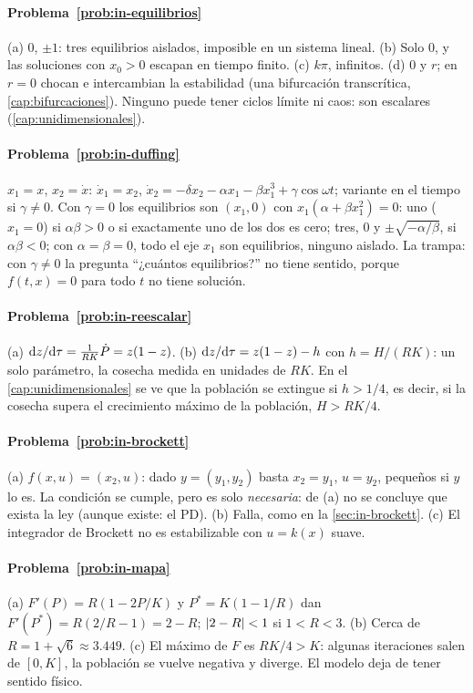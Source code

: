 \paragraph{Problema~\ref{prob:in-equilibrios}}
(a) $0$, $\pm1$: tres equilibrios aislados, imposible en un sistema lineal. (b) Solo $0$, y las soluciones con $x_0>0$ escapan en tiempo finito. (c) $k\pi$, infinitos. (d) $0$ y $r$; en $r=0$ chocan e intercambian la estabilidad (una bifurcación transcrítica, \cref{cap:bifurcaciones}). Ninguno puede tener ciclos límite ni caos: son escalares (\cref{cap:unidimensionales}).

\paragraph{Problema~\ref{prob:in-duffing}}
$x_1=x$, $x_2=\dot x$: $\dot x_1=x_2$, $\dot x_2=-\delta x_2-\alpha x_1-\beta x_1^3+\gamma\cos\omega t$; variante en el tiempo si $\gamma\neq0$. Con $\gamma=0$ los equilibrios son $(x_1,0)$ con $x_1(\alpha+\beta x_1^2)=0$: uno ($x_1=0$) si $\alpha\beta>0$ o si exactamente uno de los dos es cero; tres, $0$ y $\pm\sqrt{-\alpha/\beta}$, si $\alpha\beta<0$; con $\alpha=\beta=0$, todo el eje $x_1$ son equilibrios, ninguno aislado. La trampa: con $\gamma\neq0$ la pregunta ``¿cuántos equilibrios?'' no tiene sentido, porque $f(t,x)=0$ para todo $t$ no tiene solución.

\paragraph{Problema~\ref{prob:in-reescalar}}
(a) $\mathrm{d} z/\mathrm{d}\tau=\frac1{RK}\dot P=z(1-z)$. (b) $\mathrm{d} z/\mathrm{d}\tau=z(1-z)-h$ con $h=H/(RK)$: un solo parámetro, la cosecha medida en unidades de $RK$. En el \cref{cap:unidimensionales} se ve que la población se extingue si $h>1/4$, es decir, si la cosecha supera el crecimiento máximo de la población, $H>RK/4$.

\paragraph{Problema~\ref{prob:in-brockett}}
(a) $f(x,u)=(x_2,u)$: dado $y=(y_1,y_2)$ basta $x_2=y_1$, $u=y_2$, pequeños si $y$ lo es. La condición se cumple, pero es solo \emph{necesaria}: de (a) no se concluye que exista la ley (aunque existe: el PD). (b) Falla, como en la \cref{sec:in-brockett}. (c) El integrador de Brockett no es estabilizable con $u=k(x)$ suave.

\paragraph{Problema~\ref{prob:in-mapa}}
(a) $F'(P)=R(1-2P/K)$ y $P^*=K(1-1/R)$ dan $F'(P^*)=R(2/R-1)=2-R$; $\left\lvert 2-R\right\rvert<1$ si $1<R<3$. (b) Cerca de $R=1+\sqrt6\approx3.449$. (c) El máximo de $F$ es $RK/4>K$: algunas iteraciones salen de $[0,K]$, la población se vuelve negativa y diverge. El modelo deja de tener sentido físico.

